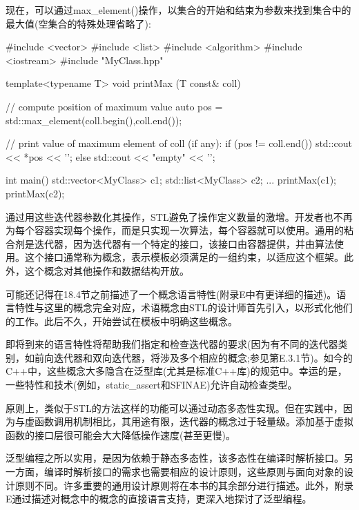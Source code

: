 现在，可以通过max\_element()操作，以集合的开始和结束为参数来找到集合中的最大值(空集合的特殊处理省略了):

\begin{cpp}
#include <vector>
#include <list>
#include <algorithm>
#include <iostream>
#include "MyClass.hpp"

template<typename T>
void printMax (T const& coll)
{
	// compute position of maximum value
	auto pos = std::max_element(coll.begin(),coll.end());
	
	// print value of maximum element of coll (if any):
	if (pos != coll.end()) {
		std::cout << *pos << '\n';
	}
	else {
		std::cout << "empty" << '\n';
	}
}

int main()
{
	std::vector<MyClass> c1;
	std::list<MyClass> c2;
	...
	printMax(c1);
	printMax(c2);
}
\end{cpp}

通过用这些迭代器参数化其操作，STL避免了操作定义数量的激增。开发者也不再为每个容器实现每个操作，而是只实现一次算法，每个容器就可以使用。通用的粘合剂是迭代器，因为迭代器有一个特定的接口，该接口由容器提供，并由算法使用。这个接口通常称为概念，表示模板必须满足的一组约束，以适应这个框架。此外，这个概念对其他操作和数据结构开放。

可能还记得在18.4节之前描述了一个概念语言特性(附录E中有更详细的描述)。语言特性与这里的概念完全对应，术语概念由STL的设计师首先引入，以形式化他们的工作。此后不久，开始尝试在模板中明确这些概念。

即将到来的语言特性将帮助我们指定和检查迭代器的要求(因为有不同的迭代器类别，如前向迭代器和双向迭代器，将涉及多个相应的概念;参见第E.3.1节)。如今的C++中，这些概念大多隐含在泛型库(尤其是标准C++库)的规范中。幸运的是，一些特性和技术(例如，static\_assert和SFINAE)允许自动检查类型。

原则上，类似于STL的方法这样的功能可以通过动态多态性实现。但在实践中，因为与虚函数调用机制相比，其用途有限，迭代器的概念过于轻量级。添加基于虚拟函数的接口层很可能会大大降低操作速度(甚至更慢)。

泛型编程之所以实用，是因为依赖于静态多态性，该多态性在编译时解析接口。另一方面，编译时解析接口的需求也需要相应的设计原则，这些原则与面向对象的设计原则不同。许多重要的通用设计原则将在本书的其余部分进行描述。此外，附录E通过描述对概念中的概念的直接语言支持，更深入地探讨了泛型编程。























